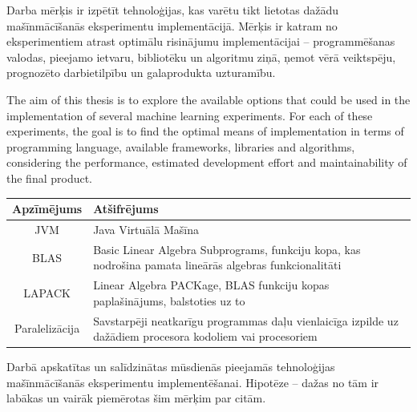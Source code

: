 \documentclass{ludis}
\begin{document}
\maketitle

\begin{abstract-lv}
  Darba mērķis ir izpētīt tehnoloģijas, kas varētu tikt lietotas dažādu mašīnmācīšanās eksperimentu implementācijā. Mērķis ir katram no eksperimentiem atrast optimālu risinājumu implementācijai -- programmēšanas valodas, pieejamo ietvaru, bibliotēku un algoritmu ziņā, ņemot vērā veiktspēju, prognozēto darbietilpību un galaprodukta uzturamību.
\end{abstract-lv}

\begin{abstract-en}
  The aim of this thesis is to explore the available options that could be used in the implementation of several machine learning experiments. For each of these experiments, the goal is to find the optimal means of implementation in terms of programming language, available frameworks, libraries and algorithms, considering the performance, estimated development effort and maintainability of the final product.
\end{abstract-en}

\tableofcontents

\setlength\LTleft{0pt}
\setlength\LTright{0pt}
\begin{longtable}{| c | p{28em} |}
  \hline
  \textbf{Apzīmējums} & \textbf{Atšifrējums}\\ 
  \endhead

  \hline
  JVM & Java Virtuālā Mašīna\\
  BLAS & Basic Linear Algebra Subprograms, funkciju kopa, kas nodrošina pamata lineārās algebras funkcionalitāti\\
  LAPACK & Linear Algebra PACKage, BLAS funkciju kopas paplašinājums, balstoties uz to\\
  Paralelizācija & Savstarpēji neatkarīgu programmas daļu vienlaicīga izpilde uz dažādiem procesora kodoliem vai procesoriem\\
  \hline
\end{longtable}

Darbā apskatītas un salīdzinātas mūsdienās pieejamās tehnoloģijas mašīnmācīšanās eksperimentu implementēšanai. Hipotēze -- dažas no tām ir labākas un vairāk piemērotas šim mērķim par citām.
\end{document}
